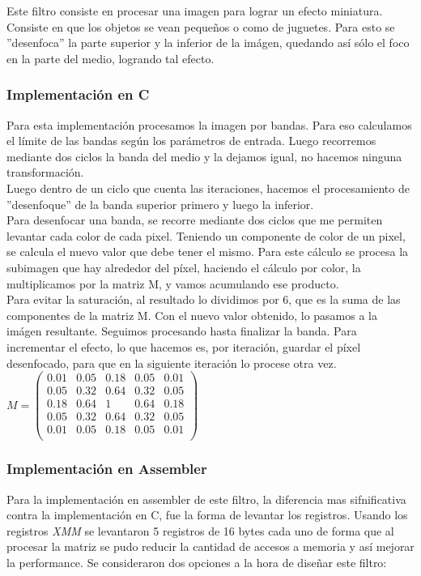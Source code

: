 Este filtro consiste en procesar una imagen para lograr un efecto miniatura. Consiste en que los objetos se vean pequeños o como de juguetes. Para esto se ''desenfoca'' la parte superior y la inferior de la im\'agen, quedando as\'i s\'olo el foco en la parte del medio, logrando tal efecto.



\subsubsection{Implementación en C}
Para esta implementaci\'on procesamos la imagen por bandas.
Para eso calculamos el límite de las bandas seg\'un los par\'ametros de entrada. Luego recorremos mediante dos ciclos la banda del medio y la dejamos igual, no hacemos ninguna transformaci\'on.\\
Luego dentro de un ciclo que cuenta las iteraciones, hacemos el procesamiento de ''desenfoque'' de la banda superior primero y luego la inferior.\\
Para desenfocar una banda, se recorre mediante dos ciclos que me permiten levantar cada color de cada pixel. Teniendo un componente de color de un pixel, se calcula el nuevo valor que debe tener el mismo. Para este c\'alculo se procesa la subimagen que hay alrededor del píxel, haciendo el c\'alculo por color, la multiplicamos por la matriz M, y vamos acumulando ese producto.\\
Para evitar la saturaci\'on, al resultado lo dividimos por 6, que es la suma de las componentes de la matriz M. Con el nuevo valor obtenido, lo pasamos a la im\'agen resultante. Seguimos procesando hasta finalizar la banda.
Para incrementar el efecto, lo que hacemos es, por iteraci\'on, guardar el p\'ixel desenfocado, para que en la siguiente iteración lo procese otra vez.\\

$M = \begin{pmatrix}
  0.01 & 0.05 & 0.18 & 0.05 & 0.01 \\
  0.05 & 0.32 & 0.64 & 0.32 & 0.05 \\
  0.18 & 0.64 & 1 & 0.64 & 0.18 \\
  0.05 & 0.32 & 0.64 & 0.32 & 0.05 \\
  0.01 & 0.05 & 0.18 & 0.05 & 0.01 \\
 \end{pmatrix}$

\subsubsection{Implementación en Assembler}
Para la implementaci\'on en assembler de este filtro, la diferencia mas sifnificativa contra la implementaci\'on en C, fue la forma de levantar los registros.
Usando los registros \emph{XMM} se levantaron 5 registros de 16 bytes cada uno de forma que al procesar la matriz se pudo reducir la cantidad de accesos a
 memoria y as\'i mejorar la performance. Se consideraron dos opciones a la hora de diseñar este filtro:\newline

